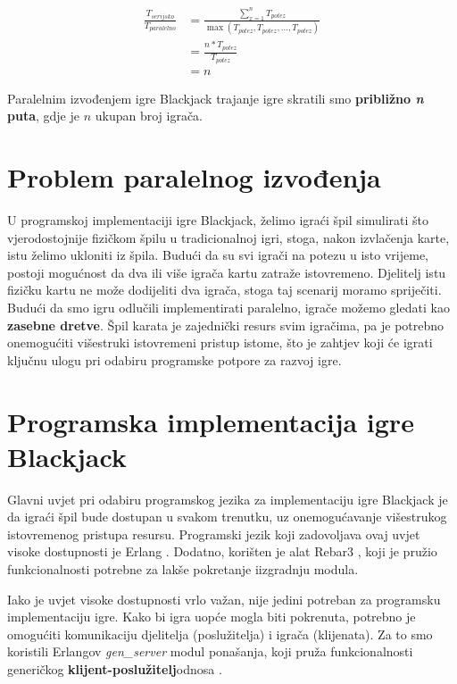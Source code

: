 \documentclass{IEEEcsmag}
\begin{document}
\begin{equation}
\begin{split}
\frac{T_{serijsko}}{T_{paralelno}} &= \frac{\sum_{x=1}^{n} T_{potez}}{\max{(T_{potez}, T_{potez}, ... , T_{potez})}} \\
&= \frac{n * T_{potez}}{T_{potez}} \\
&= n
\end{split}
\end{equation}

Paralelnim izvođenjem igre Blackjack trajanje igre skratili smo \textbf{približno \textit{n} puta}, gdje je $n$ ukupan broj igrača.
\newpage

\section{Problem paralelnog izvođenja}
\vspace{5mm}
U programskoj implementaciji igre Blackjack, želimo igraći špil simulirati što vjerodostojnije fizičkom špilu u tradicionalnoj igri, stoga, nakon izvlačenja karte, istu želimo ukloniti iz špila. Budući da su svi igrači na potezu u isto vrijeme, postoji mogućnost da dva ili više igrača kartu zatraže istovremeno. Djelitelj istu fizičku kartu ne može dodijeliti dva igrača, stoga taj scenarij moramo spriječiti. Budući da smo igru odlučili implementirati paralelno, igrače možemo gledati kao \textbf{zasebne dretve}. Špil karata je zajednički resurs svim igračima, pa je potrebno onemogućiti višestruki istovremeni pristup istome, što je zahtjev koji će igrati ključnu ulogu pri odabiru programske potpore za razvoj igre.

\section{Programska implementacija igre Blackjack}
\vspace{5mm}
Glavni uvjet pri odabiru programskog jezika za implementaciju igre Blackjack je da igraći špil bude dostupan u svakom trenutku, uz onemogućavanje višestrukog istovremenog pristupa resursu. Programski jezik koji zadovoljava ovaj uvjet visoke dostupnosti je Erlang \cite{erlang}. Dodatno, korišten je alat Rebar3 \cite{rebar3}, koji je pružio funkcionalnosti potrebne za lakše pokretanje i\break izgradnju modula.

Iako je uvjet visoke dostupnosti vrlo važan, nije jedini potreban za programsku implementaciju igre. Kako bi igra uopće mogla biti pokrenuta, potrebno je omogućiti komunikaciju djelitelja (poslužitelja) i igrača (klijenata). Za to smo koristili Erlangov \textit{gen\_server} modul ponašanja, koji pruža funkcionalnosti generičkog \textbf{klijent-poslužitelj}\break odnosa \cite{gen_server}.
\end{document}
